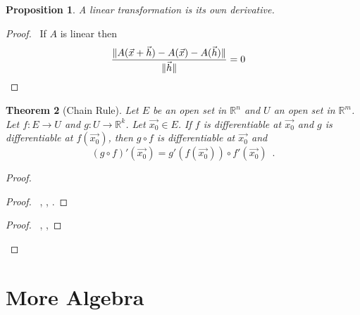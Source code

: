 \documentclass{book}
\let\qed\relax
\newtheorem{prop}{Proposition}[chapter]
\newtheorem{thm}[prop]{Theorem}
\theoremstyle{definition}
\begin{document}
\begin{prop}
A linear transformation is its own derivative.
\end{prop}

\begin{proof}
	\pf\ If $A$ is linear then
	\begin{align*}
		\frac{\| A(\vec{x} + \vec{h}) - A(\vec{x}) - A(\vec{h})\|}{\| \vec{h}\|} & = 0 & \qed
	\end{align*}
\end{proof}

\begin{thm}[Chain Rule]
Let $E$ be an open set in $\mathbb{R}^n$ and $U$ an open set in $\mathbb{R}^m$. Let $f : E \rightarrow U$ and $g : U \rightarrow \mathbb{R}^k$. Let $\vec{x_0} \in E$. If $f$ is differentiable at $\vec{x_0}$ and $g$ is differentiable at $f(\vec{x_0})$, then $g \circ f$ is differentiable at $\vec{x_0}$ and
\[ (g \circ f)'(\vec{x_0}) = g'(f(\vec{x_0})) \circ f'(\vec{x_0}) \enspace . \]
\end{thm}

\begin{proof}
\pf
{}
\begin{proof}
	\pf\ , , .
\end{proof}
\begin{proof}
	\pf\ , , 
\end{proof}
\end{proof}

\part{More Algebra}
\end{document}
